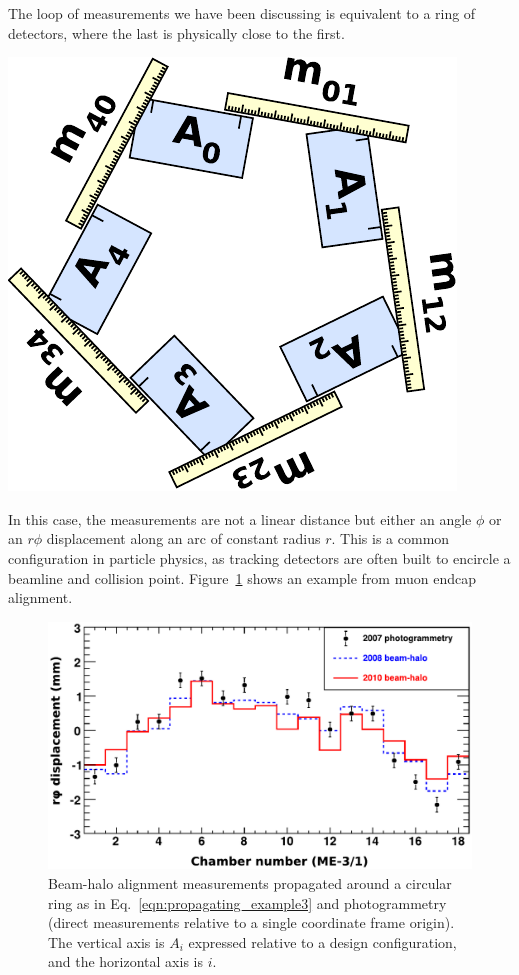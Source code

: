 \documentclass[12pt]{article}
\begin{document}
\vspace{0.2 cm}
\noindent \begin{minipage}{\linewidth}
\hspace{0.4 cm} The loop of measurements we have been discussing is equivalent to a
ring of detectors, where the last is physically close to the first.
\begin{center}
\includegraphics[width=0.37\linewidth]{PLOTS/propagating_example2.pdf}
\end{center}
\end{minipage}

\vspace{0.4 cm}
In this case, the measurements are not a linear distance but either an
angle $\phi$ or an $r\phi$ displacement along an arc of constant
radius $r$.  This is a common configuration in particle physics, as
tracking detectors are often built to encircle a beamline and
collision point.  Figure~\ref{fig:beamhalo_ring} shows an example from
muon endcap alignment.

\begin{figure}
\begin{center}
\includegraphics[width=0.75\linewidth]{PLOTS/compare_m31_x.pdf}
\end{center}
\caption{Beam-halo alignment measurements propagated around a circular
  ring as in Eq.~\ref{eqn:propagating_example3} and photogrammetry
  (direct measurements relative to a single coordinate frame origin).
  The vertical axis is $A_i$ expressed relative to a design
  configuration, and the horizontal axis is
  $i$. \label{fig:beamhalo_ring}}
\end{figure}
\end{document}
